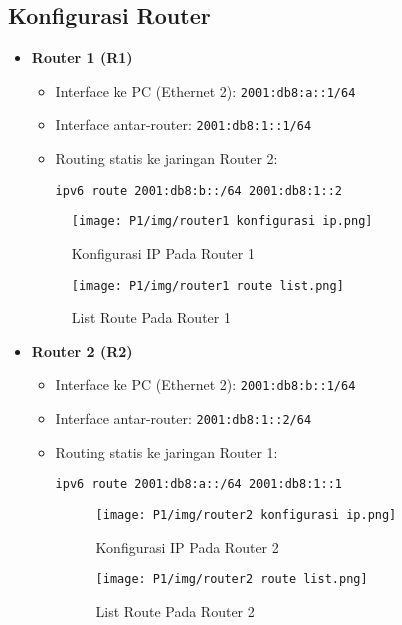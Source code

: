 \subsection*{Konfigurasi Router}

\begin{itemize}
    \item \textbf{Router 1 (R1)}
    \begin{itemize}
        \item Interface ke PC (Ethernet 2): \texttt{2001:db8:a::1/64}
        \item Interface antar-router: \texttt{2001:db8:1::1/64}
        \item Routing statis ke jaringan Router 2:
        \begin{verbatim}
ipv6 route 2001:db8:b::/64 2001:db8:1::2
        \end{verbatim}
    \end{itemize}

\begin{figure}[H]
    \centering
    \texttt{[image: P1/img/router1 konfigurasi ip.png]}
    \caption{Konfigurasi IP Pada Router 1}
\end{figure}

\begin{figure}[H]
    \centering
    \texttt{[image: P1/img/router1 route list.png]}
    \caption{List Route Pada Router 1}
\end{figure}

    \item \textbf{Router 2 (R2)}
    \begin{itemize}
        \item Interface ke PC (Ethernet 2): \texttt{2001:db8:b::1/64}
        \item Interface antar-router: \texttt{2001:db8:1::2/64}
        \item Routing statis ke jaringan Router 1:
        \begin{verbatim}
ipv6 route 2001:db8:a::/64 2001:db8:1::1
        \end{verbatim}

\begin{figure}[H]
    \centering
    \texttt{[image: P1/img/router2 konfigurasi ip.png]}
    \caption{Konfigurasi IP Pada Router 2}
\end{figure}

\begin{figure}[H]
    \centering
    \texttt{[image: P1/img/router2 route list.png]}
    \caption{List Route Pada Router 2}
\end{figure}
        
    \end{itemize}
\end{itemize}

